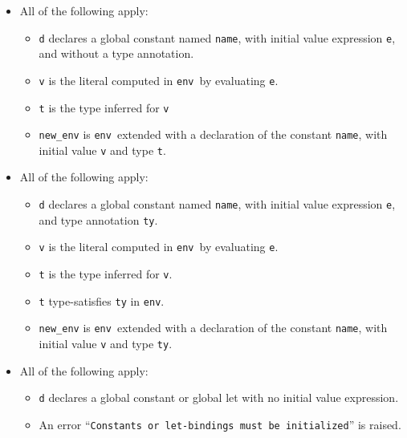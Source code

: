 \documentclass{book}
\newcommand\name[0]{\texttt{name}}
\newcommand\tenv[0]{\texttt{env}}
\begin{document}
\begin{itemize}
  \item All of the following apply:
  \begin{itemize}
    \item \texttt{d} declares a global constant named \name, with initial value expression \texttt{e}, and without a type annotation.
    \item \texttt{v} is the literal computed in \tenv\ by evaluating \texttt{e}.
    \item \texttt{t} is the type inferred for \texttt{v}
    \item \texttt{new\_env} is \tenv\ extended with a declaration of the constant \name, with initial value \texttt{v} and type \texttt{t}.
  \end{itemize}

  \item All of the following apply:
  \begin{itemize}
    \item \texttt{d} declares a global constant named \name, with initial value expression \texttt{e}, and type annotation \texttt{ty}.
    \item \texttt{v} is the literal computed in \tenv\ by evaluating \texttt{e}.
    \item \texttt{t} is the type inferred for \texttt{v}.
    \item \texttt{t} type-satisfies \texttt{ty} in \tenv.
    \item \texttt{new\_env} is \tenv\ extended with a declaration of the constant \name, with initial value \texttt{v} and type \texttt{ty}.
  \end{itemize}

  \item All of the following apply:
  \begin{itemize}
    \item \texttt{d} declares a global constant or global let with no initial value expression.
    \item An error ``\texttt{Constants or let-bindings must be initialized}'' is raised.
  \end{itemize}


\end{itemize}
\end{document}
